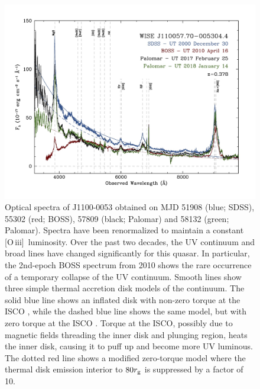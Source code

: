 \documentclass[a4paper,fleqn,usenatbib]{mnras}
\begin{document}
\begin{figure}
  \centering
  \includegraphics[width=17.0cm, trim=0.0cm 0.0cm 0.0cm 0.0cm, clip]
  {../plots/spectra/w1100m0053_sdss_palomar2.jpg}
\vspace{-16pt}
  \caption[]{
    Optical spectra of J1100-0053 obtained on MJD 51908 (blue; SDSS),
    55302 (red; BOSS), 57809 (black; Palomar) and 58132 (green;
    Palomar). Spectra have been renormalized to maintain a constant
    [O\,{\sc iii}]\ luminosity. Over the past two decades, the UV
    continuum and broad lines have changed significantly for this quasar.
    In particular, the 2nd-epoch BOSS spectrum from 2010 shows the rare
    occurrence of a temporary collapse of the UV continuum.  Smooth lines
    show three simple thermal accretion disk models of the continuum.  The
    solid blue line shows an inflated disk with non-zero torque at the
    ISCO \cite[e.g.,][]{Sirko_Goodman2003}, while the dashed blue line
    shows the same model, but with zero torque at the ISCO \cite[i.e.,
    equivalent to a simple $\alpha$-disk model,][]{SS73}.  Torque at the
    ISCO, possibly due to magnetic fields threading the inner disk and
    plunging region, heats the inner disk, causing it to puff up and
    become more UV luminous.  The dotted red line shows a modified
    zero-torque model where the thermal disk emission interior to $80
    r_{\rm g}$ is suppressed by a factor of 10.}
  \label{fig:J110057_spectra}
\end{figure}
\end{document}

